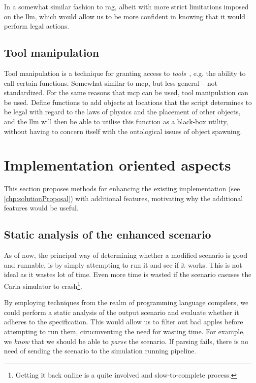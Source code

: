 In a somewhat similar fashion to \acrshort{rag}, albeit with more strict limitations imposed on the
\acrshort{llm}, which would allow us to be more confident in knowing that it would perform legal actions.

\subsection{Tool manipulation}

Tool manipulation is a technique for granting  access to
\emph{tools}~\cite[62]{llmSurvey}, e.g. the ability to call certain functions. Somewhat similar to
\acrshort{mcp}, but less general -- not standardized. For the same reasons that \acrshort{mcp} can
be used, tool manipulation can be used. Define functions to add objects at locations that the script
determines to be legal with regard to the laws of physics and the placement of other objects, and
the \acrshort{llm} will then be able to utilise this function as a black-box utility, without
having to concern itself with the ontological issues of object spawning.

\section{Implementation oriented aspects}

This section proposes methods for enhancing the existing implementation (see
\cref{chp:solutionProposal}) with additional features, motivating why the
additional features would be useful.

\subsection{Static analysis of the enhanced scenario}

As of now, the principal way of determining whether a modified scenario is good and runnable, is by
simply attempting to run it and see if it works. This is not ideal as it wastes lot of time. Even
more time is wasted if the scenario casuses the Carla simulator to crash\footnote{Getting it back
    online is a quite involved and slow-to-complete process.}.

By employing techniques from the realm of programming language compilers, we could perform a static
analysis of the output scenario and evaluate whether it adheres to the specification. This would
allow us to filter out bad apples before attempting to run them, cirucmventing the need for wasting
time.
For example, we \emph{know} that we should be able to \emph{parse} the scenario. If parsing
fails, there is no need of sending the scenario to the simulation running pipeline.

